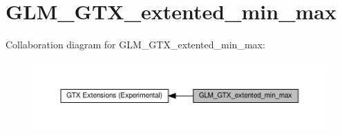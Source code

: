 \hypertarget{group__gtx__extented__min__max}{}\section{G\+L\+M\+\_\+\+G\+T\+X\+\_\+extented\+\_\+min\+\_\+max}
\label{group__gtx__extented__min__max}
Collaboration diagram for G\+L\+M\+\_\+\+G\+T\+X\+\_\+extented\+\_\+min\+\_\+max\+:\nopagebreak
\begin{figure}[H]
\begin{center}
\leavevmode
\includegraphics[width=350pt]{group__gtx__extented__min__max}
\end{center}
\end{figure}

